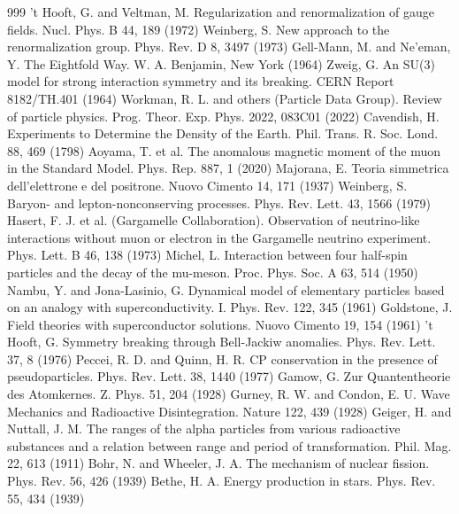 \begin{thebibliography}{999}
 't Hooft, G. and Veltman, M. Regularization and renormalization of gauge fields. Nucl. Phys. B 44, 189 (1972)
 Weinberg, S. New approach to the renormalization group. Phys. Rev. D 8, 3497 (1973)
 Gell-Mann, M. and Ne'eman, Y. The Eightfold Way. W. A. Benjamin, New York (1964)
 Zweig, G. An SU(3) model for strong interaction symmetry and its breaking. CERN Report 8182/TH.401 (1964)
 Workman, R. L. and others (Particle Data Group). Review of particle physics. Prog. Theor. Exp. Phys. 2022, 083C01 (2022)
 Cavendish, H. Experiments to Determine the Density of the Earth. Phil. Trans. R. Soc. Lond. 88, 469 (1798)
 Aoyama, T. et al. The anomalous magnetic moment of the muon in the Standard Model. Phys. Rep. 887, 1 (2020)
 Majorana, E. Teoria simmetrica dell'elettrone e del positrone. Nuovo Cimento 14, 171 (1937)
 Weinberg, S. Baryon- and lepton-nonconserving processes. Phys. Rev. Lett. 43, 1566 (1979)
 Hasert, F. J. et al. (Gargamelle Collaboration). Observation of neutrino-like interactions without muon or electron in the Gargamelle neutrino experiment. Phys. Lett. B 46, 138 (1973)
 Michel, L. Interaction between four half-spin particles and the decay of the mu-meson. Proc. Phys. Soc. A 63, 514 (1950)
 Nambu, Y. and Jona-Lasinio, G. Dynamical model of elementary particles based on an analogy with superconductivity. I. Phys. Rev. 122, 345 (1961)
 Goldstone, J. Field theories with superconductor solutions. Nuovo Cimento 19, 154 (1961)
 't Hooft, G. Symmetry breaking through Bell-Jackiw anomalies. Phys. Rev. Lett. 37, 8 (1976)
 Peccei, R. D. and Quinn, H. R. CP conservation in the presence of pseudoparticles. Phys. Rev. Lett. 38, 1440 (1977)
 Gamow, G. Zur Quantentheorie des Atomkernes. Z. Phys. 51, 204 (1928)
 Gurney, R. W. and Condon, E. U. Wave Mechanics and Radioactive Disintegration. Nature 122, 439 (1928)
 Geiger, H. and Nuttall, J. M. The ranges of the alpha particles from various radioactive substances and a relation between range and period of transformation. Phil. Mag. 22, 613 (1911)
 Bohr, N. and Wheeler, J. A. The mechanism of nuclear fission. Phys. Rev. 56, 426 (1939)
 Bethe, H. A. Energy production in stars. Phys. Rev. 55, 434 (1939)

\end{thebibliography}
